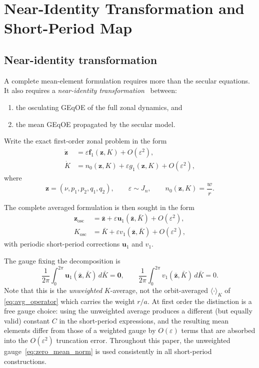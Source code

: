 \documentclass[11pt]{article}
\begin{document}
\section{Near-Identity Transformation and Short-Period Map}
\label{sec:near_identity}

\subsection{Near-identity transformation}

A complete mean-element formulation requires more than the secular equations.
It also requires a \emph{near-identity
transformation}~\cite{deprit1969,hori1966} between:
\begin{enumerate}
    \item the osculating GEqOE of the full zonal dynamics, and
    \item the mean GEqOE propagated by the secular model.
\end{enumerate}

Write the exact first-order zonal problem in the form
\begin{align}
\dot{\bm z} &= \varepsilon \bm f_1(\bm z,K) + O(\varepsilon^2), \\
\dot K &= n_0(\bm z,K) + \varepsilon g_1(\bm z,K) + O(\varepsilon^2),
\label{eq:j2_fast_slow_form}
\end{align}
where
\begin{equation}
\bm z = (\nu,p_1,p_2,q_1,q_2),
\qquad
\varepsilon \sim J_n,
\qquad
n_0(\bm z,K) = \frac{w}{r}.
\end{equation}

The complete averaged formulation is then sought in the form
\begin{align}
\bm z_{\mathrm{osc}}
&= \bar{\bm z}
+ \varepsilon \bm u_1(\bar{\bm z},\bar K)
+ O(\varepsilon^2), \label{eq:forward_map_z}\\
K_{\mathrm{osc}}
&= \bar K
+ \varepsilon v_1(\bar{\bm z},\bar K)
+ O(\varepsilon^2), \label{eq:forward_map_K}
\end{align}
with periodic short-period corrections $\bm u_1$ and $v_1$.

The gauge fixing the decomposition is
\begin{equation}
\frac{1}{2\pi}\int_0^{2\pi} \bm u_1(\bar{\bm z},\bar K)\,d\bar K = \bm 0,
\qquad
\frac{1}{2\pi}\int_0^{2\pi} v_1(\bar{\bm z},\bar K)\,d\bar K = 0.
\label{eq:zero_mean_norm}
\end{equation}
Note that this is the \emph{unweighted} $K$-average, not the
orbit-averaged $\langle \cdot \rangle_K$ of \eqref{eq:avg_operator} which
carries the weight $r/a$. At first order the distinction is a free gauge
choice: using the unweighted average produces a different (but equally
valid) constant $C$ in the short-period expressions, and the resulting
mean elements differ from those of a weighted gauge by $O(\varepsilon)$
terms that are absorbed into the $O(\varepsilon^2)$ truncation error.
Throughout this paper, the unweighted gauge~\eqref{eq:zero_mean_norm} is
used consistently in all short-period constructions.
\end{document}
